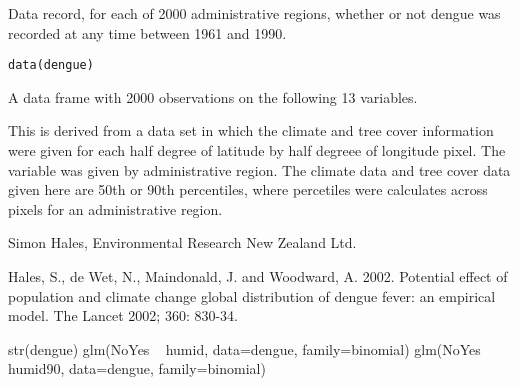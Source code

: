 \begin{Description}\relax
Data record, for each of 2000 administrative regions,
whether or not dengue was recorded at any time between 1961 and 1990.
\end{Description}
\begin{Usage}
\begin{verbatim}data(dengue)\end{verbatim}
\end{Usage}
\begin{Format}\relax
A data frame with 2000 observations on the following 13 variables.
\end{Format}
\begin{Details}\relax
This is derived from a data set in which the climate and tree cover
information were given for each half degree of latitude by half
degreee of longitude pixel.
The variable  was given by administrative region.
The climate data and tree cover data given here are 50th or 90th
percentiles, where percetiles were calculates across pixels for an
administrative region.
\end{Details}
\begin{Source}\relax
Simon Hales, Environmental Research New Zealand Ltd.
\end{Source}
\begin{References}\relax
Hales, S., de Wet, N., Maindonald, J. and Woodward, A.
2002.  Potential effect of population and climate change global
distribution of dengue fever: an empirical model.  The Lancet 2002;
360: 830-34.
\end{References}
\begin{Examples}
\begin{ExampleCode}
str(dengue)
glm(NoYes ~ humid, data=dengue, family=binomial)
glm(NoYes ~ humid90, data=dengue, family=binomial)
\end{ExampleCode}
\end{Examples}

